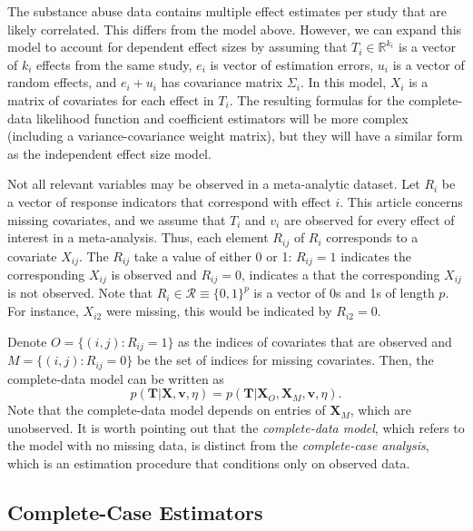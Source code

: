 \documentclass[
]{article}
\begin{document}
The substance abuse data contains multiple effect estimates per study that are likely correlated.
This differs from the model above.
However, we can expand this model to account for dependent effect sizes by assuming that \(T_i \in \mathbb{R}^{k_i}\) is a vector of \(k_i\) effects from the same study, \(e_i\) is vector of estimation errors, \(u_i\) is a vector of random effects, and \(e_i + u_i\) has covariance matrix \(\Sigma_i\).
In this model, \(X_i\) is a matrix of covariates for each effect in \(T_i\).
The resulting formulas for the complete-data likelihood function and coefficient estimators will be more complex (including a variance-covariance weight matrix), but they will have a similar form as the independent effect size model.

Not all relevant variables may be observed in a meta-analytic dataset.
Let \(R_i\) be a vector of response indicators that correspond with effect \(i\).
This article concerns missing covariates, and we assume that \(T_i\) and \(v_i\) are observed for every effect of interest in a meta-analysis.
Thus, each element \(R_{ij}\) of \(R_i\) corresponds to a covariate \(X_{ij}\).
The \(R_{ij}\) take a value of either 0 or 1: \(R_{ij} = 1\) indicates the corresponding \(X_{ij}\) is observed and \(R_{ij} = 0\), indicates a that the corresponding \(X_{ij}\) is not observed.
Note that \(R_i \in \mathcal{R} \equiv \{0,1\}^p\) is a vector of 0s and 1s of length \(p\).
For instance, \(X_{i2}\) were missing, this would be indicated by \(R_{i2} = 0\).

Denote \(O = \{(i, j): R_{ij} = 1\}\) as the indices of covariates that are observed and \(M = \{(i, j): R_{ij} = 0\}\) be the set of indices for missing covariates.
Then, the complete-data model can be written as
\begin{equation}
p(\mathbf{T} | \mathbf{X}, \mathbf{v}, \eta) = p(\mathbf{T} | \mathbf{X}_{O}, \mathbf{X}_{M}, \mathbf{v}, \eta). 
\label{eq:full-data-prob_mis}
\end{equation}
Note that the complete-data model depends on entries of \(\mathbf{X}_{M}\), which are unobserved.
It is worth pointing out that the \emph{complete-data model}, which refers to the model with no missing data, is distinct from the \emph{complete-case analysis}, which is an estimation procedure that conditions only on observed data.

\hypertarget{complete-case-estimators}{%
\subsection{Complete-Case Estimators}\label{complete-case-estimators}}
\end{document}
